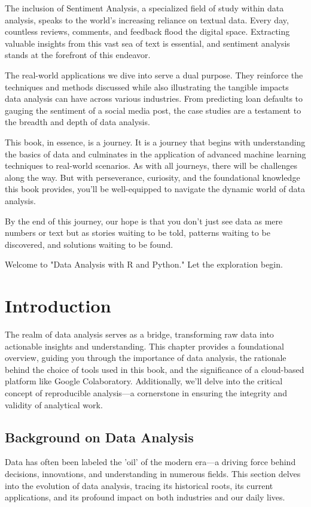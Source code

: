 \documentclass[a4paper,12pt]{book}
\begin{document}
The inclusion of Sentiment Analysis, a specialized field of study within data analysis, speaks to the world's increasing reliance on textual data. Every day, countless reviews, comments, and feedback flood the digital space. Extracting valuable insights from this vast sea of text is essential, and sentiment analysis stands at the forefront of this endeavor.

The real-world applications we dive into serve a dual purpose. They reinforce the techniques and methods discussed while also illustrating the tangible impacts data analysis can have across various industries. From predicting loan defaults to gauging the sentiment of a social media post, the case studies are a testament to the breadth and depth of data analysis.

This book, in essence, is a journey. It is a journey that begins with understanding the basics of data and culminates in the application of advanced machine learning techniques to real-world scenarios. As with all journeys, there will be challenges along the way. But with perseverance, curiosity, and the foundational knowledge this book provides, you'll be well-equipped to navigate the dynamic world of data analysis.

By the end of this journey, our hope is that you don't just see data as mere numbers or text but as stories waiting to be told, patterns waiting to be discovered, and solutions waiting to be found.

Welcome to "Data Analysis with R and Python." Let the exploration begin.

\chapter{Introduction}
The realm of data analysis serves as a bridge, transforming raw data into actionable insights and understanding. This chapter provides a foundational overview, guiding you through the importance of data analysis, the rationale behind the choice of tools used in this book, and the significance of a cloud-based platform like Google Colaboratory. Additionally, we'll delve into the critical concept of reproducible analysis—a cornerstone in ensuring the integrity and validity of analytical work.

\section{Background on Data Analysis}
Data has often been labeled the 'oil' of the modern era—a driving force behind decisions, innovations, and understanding in numerous fields. This section delves into the evolution of data analysis, tracing its historical roots, its current applications, and its profound impact on both industries and our daily lives.
\end{document}
